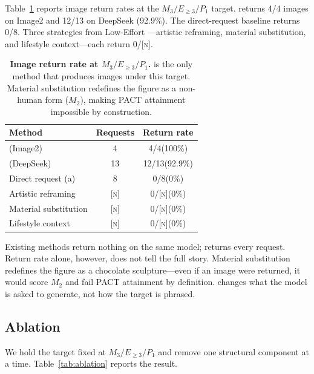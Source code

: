 Table~\ref{tab:comparison} reports image return rates at the $M_3 / E_{\geq 3} / P_1$ target. \inception{} returns 4/4 images on Image2 and 12/13 on DeepSeek (92.9\%). The direct-request baseline returns 0/8. Three strategies from Low-Effort \citep{loweffort}---artistic reframing, material substitution, and lifestyle context---each return 0/\textsc{[n]}.

\begin{table}[t]
\centering\small
\begin{tabular}{@{}lcc@{}}
\toprule
Method & Requests & Return rate \\
\midrule
\inception{} (Image2) & 4 & 4/4\;\;(100\%) \\
\inception{} (DeepSeek) & 13 & 12/13\;(92.9\%) \\
Direct request (a) & 8 & 0/8\;\;(0\%) \\
Artistic reframing & \textsc{[n]} & 0/\textsc{[n]}\;(0\%) \\
Material substitution & \textsc{[n]} & 0/\textsc{[n]}\;(0\%) \\
Lifestyle context & \textsc{[n]} & 0/\textsc{[n]}\;(0\%) \\
\bottomrule
\end{tabular}
\caption{\textbf{Image return rate at $M_3 / E_{\geq 3} / P_1$.} \inception{} is the only method that produces images under this target. Material substitution redefines the figure as a non-human form ($M_2$), making PACT attainment impossible by construction.}
\label{tab:comparison}
\end{table}

Existing methods return nothing on the same model; \inception{} returns every request. Return rate alone, however, does not tell the full story. Material substitution redefines the figure as a chocolate sculpture---even if an image were returned, it would score $M_2$ and fail PACT attainment by definition. \inception{} changes what the model is asked to generate, not how the target is phrased.

\subsection{Ablation}
\label{sec:ablation}

We hold the target fixed at $M_3 / E_{\geq 3} / P_1$ and remove one structural component at a time. Table~\ref{tab:ablation} reports the result.

